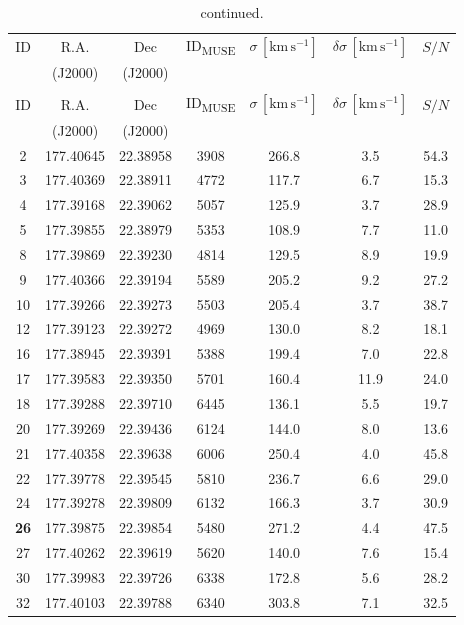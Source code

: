 \documentclass{aa}
\begin{document}
\begin{appendix}
\begin{longtable}{c c c c c c c}
\caption{\label{tab:table1149} Velocity dispersion catalogue for M1149.}\\
\hline\hline
ID & R.A. & Dec & ID\textsubscript{MUSE} & $\sigma \, [\mathrm{km \, s^{-1}}]$ & $\delta \sigma \, [\mathrm{km \, s^{-1}}]$ & $S/N$ \\  & (J2000) & (J2000) & & & & \\
\hline
\endfirsthead
\caption{continued.}\\
\hline\hline
ID & R.A. & Dec & ID\textsubscript{MUSE} & $\sigma \, [\mathrm{km \, s^{-1}}]$ & $\delta \sigma \, [\mathrm{km \, s^{-1}}]$ & $S/N$ \\  & (J2000) & (J2000) & & & & \\
\hline
\endhead
\hline
\endfoot
%
2 & 177.40645 & 22.38958 & 3908 & 266.8 & 3.5 & 54.3 \\
3 & 177.40369 & 22.38911 & 4772 & 117.7 & 6.7 & 15.3 \\
4 & 177.39168 & 22.39062 & 5057 & 125.9 & 3.7 & 28.9 \\
5 & 177.39855 & 22.38979 & 5353 & 108.9 & 7.7 & 11.0 \\
8 & 177.39869 & 22.39230 & 4814 & 129.5 & 8.9 & 19.9 \\
9 & 177.40366 & 22.39194 & 5589 & 205.2 & 9.2 & 27.2 \\
10 & 177.39266 & 22.39273 & 5503 & 205.4 & 3.7 & 38.7 \\
12 & 177.39123 & 22.39272 & 4969 & 130.0 & 8.2 & 18.1 \\
16 & 177.38945 & 22.39391 & 5388 & 199.4 & 7.0 & 22.8 \\
17 & 177.39583 & 22.39350 & 5701 & 160.4 & 11.9 & 24.0 \\
18 & 177.39288 & 22.39710 & 6445 & 136.1 & 5.5 & 19.7 \\
20 & 177.39269 & 22.39436 & 6124 & 144.0 & 8.0 & 13.6 \\
21 & 177.40358 & 22.39638 & 6006 & 250.4 & 4.0 & 45.8 \\
22 & 177.39778 & 22.39545 & 5810 & 236.7 & 6.6 & 29.0 \\
24 & 177.39278 & 22.39809 & 6132 & 166.3 & 3.7 & 30.9 \\
\textbf{26} & 177.39875 & 22.39854 & 5480 & 271.2 & 4.4 & 47.5 \\
27 & 177.40262 & 22.39619 & 5620 & 140.0 & 7.6 & 15.4 \\
30 & 177.39983 & 22.39726 & 6338 & 172.8 & 5.6 & 28.2 \\
32 & 177.40103 & 22.39788 & 6340 & 303.8 & 7.1 & 32.5 \\

\end{longtable}
\end{appendix}
\end{document}
